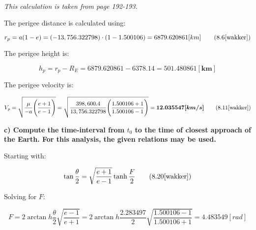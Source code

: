 \bigskip

\noindent \textit{This calculation is taken from \cite{wakker} page 192-193.}

\bigskip

\noindent The perigee distance is calculated using:

\begin{equation}
    r_{p} = a(1 - e) = (-13,756.322798) \cdot (1 - 1.500106) = 6879.620861 [km]
    \tag{8.6\cite{wakker}}
    \label{eq:q3_a9}
\end{equation}

\noindent The perigee height is:

\begin{equation}
    h_{p} = r_{p} - R_{E} = 6879.620861 - 6378.14 = \boldsymbol{501.480861 [km]}
    \label{eq:q3_a10}
\end{equation}

\noindent The perigee velocity is:

\begin{equation}
    V_{p} = \sqrt{ \frac{\mu}{-a} \Bigg( \frac{e + 1}{e - 1} \Bigg)} = \sqrt{ \frac{398,600.4}{13,756.322798} \Bigg( \frac{1.500106 + 1}{1.500106 - 1} \Bigg)} = \boldsymbol{12.035547 [km/s]}
    \tag{8.11\cite{wakker}}
    \label{eq:q3_a11}
\end{equation}










\noindent \textbf{c) Compute the time-interval from $t_{0}$ to the time of closest approach of the Earth. For this analysis, the given relations may be used.}

\bigskip

\noindent Starting with:

\begin{equation}
    \tan{\frac{\theta}{2}} = \sqrt{\frac{e + 1}{e - 1}}\tanh{\frac{F}{2}}
    \tag{8.20\cite{wakker}}
    \label{eq:q3_a12}
\end{equation}

\noindent Solving for $F$:

\begin{equation}
    F = 2 \arctan h{\frac{\theta}{2}} \sqrt{\frac{e - 1}{e + 1}}= 2 \arctan h{\frac{2.283497}{2}} \sqrt{\frac{1.500106 - 1}{1.500106 + 1}} = 4.483549 [rad]
    \label{eq:q3_a13}
\end{equation}

